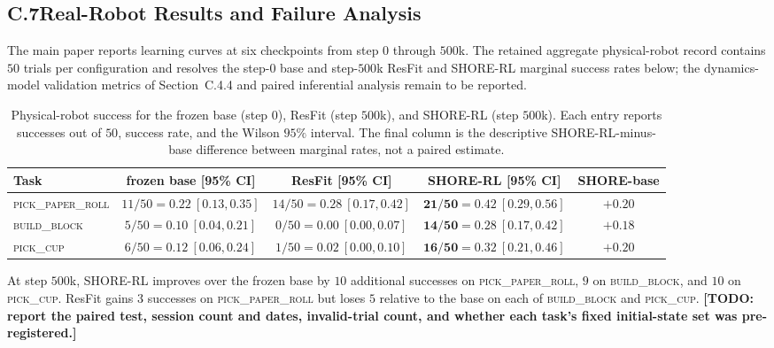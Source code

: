 \documentclass[letterpaper]{article} %
\newcommand{\todo}[1]{\textbf{[TODO: #1]}}
\begin{document}
\subsection{C.7\quad Real-Robot Results and Failure Analysis}

The main paper reports learning curves at six checkpoints from step $0$ through
$500$k. The retained aggregate physical-robot record contains $50$ trials per
configuration and resolves the step-$0$ base and step-$500$k ResFit and SHORE-RL
marginal success rates below; the dynamics-model validation metrics of
Section~C.4.4 and paired inferential analysis remain to be reported.

\begin{table}[t]
\centering\small\setlength{\tabcolsep}{4pt}
\begin{tabular}{@{}lcccc@{}}
\toprule
Task & frozen base [95\% CI] & ResFit [95\% CI] & \textbf{SHORE-RL [95\% CI]} & SHORE-base \\
\midrule
\textsc{pick\_paper\_roll} & $11/50=0.22\ [0.13,0.35]$ & $14/50=0.28\ [0.17,0.42]$ & $\mathbf{21/50=0.42\ [0.29,0.56]}$ & $+0.20$ \\
\textsc{build\_block}      & $ 5/50=0.10\ [0.04,0.21]$ & $ 0/50=0.00\ [0.00,0.07]$ & $\mathbf{14/50=0.28\ [0.17,0.42]}$ & $+0.18$ \\
\textsc{pick\_cup}         & $ 6/50=0.12\ [0.06,0.24]$ & $ 1/50=0.02\ [0.00,0.10]$ & $\mathbf{16/50=0.32\ [0.21,0.46]}$ & $+0.20$ \\
\bottomrule
\end{tabular}
\caption{Physical-robot success for the frozen base (step $0$), ResFit (step
$500$k), and SHORE-RL (step $500$k). Each entry reports successes out of $50$,
success rate, and the Wilson $95\%$ interval. The final column is the
descriptive SHORE-RL-minus-base difference between marginal rates, not a paired
estimate.}
\label{tab:realresults}
\end{table}

At step $500$k, SHORE-RL improves over the frozen base by $10$ additional
successes on \textsc{pick\_paper\_roll}, $9$ on \textsc{build\_block}, and
$10$ on \textsc{pick\_cup}. ResFit gains $3$ successes on
\textsc{pick\_paper\_roll} but loses $5$ relative to the base on each of
\textsc{build\_block} and \textsc{pick\_cup}. \todo{report the paired test, session count and
dates, invalid-trial count, and whether each task's fixed initial-state set was
pre-registered.}
\end{document}
